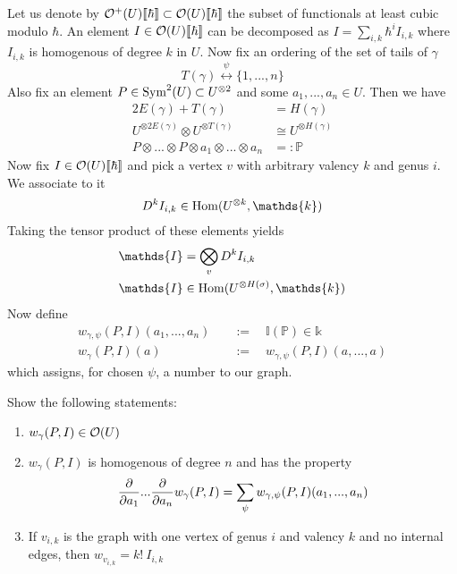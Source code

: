 \begin{definition}
  Let us denote by $\mathcal{O}^+(U) \llbracket \hbar \rrbracket \subset \mathcal{O}(U) \llbracket \hbar \rrbracket$ the subset of functionals at least cubic modulo $\hbar$. An element $I \in \mathcal{O}(U) \llbracket \hbar \rrbracket$ can be decomposed as $I = \sum_{i,k} \hbar^i I_{i,k}$ where $I_{i,k}$ is homogenous of degree $k$ in $U$. Now fix an ordering of the set of tails of $\gamma$
  $$ T(\gamma) \overset{\psi}{\longleftrightarrow} \{1, ..., n\}$$
  Also fix an element $P \in \operatorname{Sym}^2(U) \subset U^{\otimes 2}$ and some $a_1, ..., a_n \in U$. Then we have
  \begin{align}
    2 E(\gamma) + T(\gamma) &= H(\gamma) \\
    U^{\otimes 2 E(\gamma)} \otimes U^{\otimes T(\gamma)} &\cong U^{\otimes H(\gamma)} \\
    P \otimes ... \otimes P \otimes a_1 \otimes ... \otimes a_n &=: \mathds{P}
  \end{align}
  Now fix $I \in \mathcal{O}(U) \llbracket \hbar \rrbracket$ and pick a vertex $v$ with arbitrary valency $k$ and genus $i$. We associate to it
  $$ D^k I_{i,k} \in \Hom(U^{\otimes k}, \mathds{k}) $$
  Taking the tensor product of these elements yields
  \begin{align}
    \mathds{I} &= \bigotimes_v D^k I_{i,k}\\
    \mathds{I} &\in \Hom(U^{\otimes H(\sigma)}, \mathds{k})
  \end{align}
  Now define
  \begin{align}
    w_{\gamma, \psi} (P,I) (a_1, ..., a_n) \quad &:= \quad \mathds{I}(\mathds{P}) \in \mathds{k} \\
    w_\gamma (P,I) (a) \quad &:= \quad w_{\gamma,\psi} (P,I)(a, ..., a)
  \end{align}
  which assigns, for chosen $\psi$, a number to our graph.
\end{definition}

\begin{ex}
Show the following statements:
\begin{enumerate}
  \item $w_\gamma(P,I) \in \mathcal{O}(U)$

  \item $w_\gamma(P,I)$ is homogenous of degree $n$ and has the property
  $$ \frac{\partial }{\partial a_1} ... \frac{\partial }{\partial a_n} w_\gamma(P,I) = \sum_\psi w_{\gamma, \psi} (P,I) (a_1, ..., a_n) $$

  \item If $v_{i,k}$ is the graph with one vertex of genus $i$ and valency $k$ and no internal edges, then $w_{v_{i,k}} = k! \ I_{i,k}$
\end{enumerate}
\end{ex}

